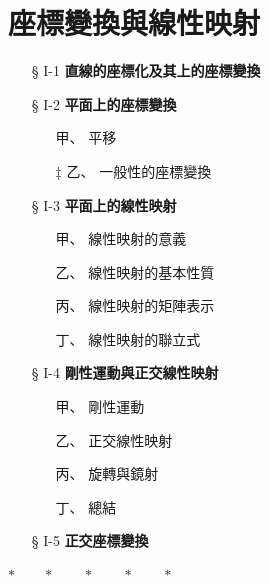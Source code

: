 
\section{座標變換與線性映射}
\label{sec:b4s-ch1}

\begin{center}
\begin{minipage}{0.75\textwidth}
\begin{itemize}[leftmargin=2em, itemsep=0.3em]
  \item[§ I-1] \textbf{直線的座標化及其上的座標變換}
  \item[§ I-2] \textbf{平面上的座標變換}
  \begin{itemize}[leftmargin=2em, itemsep=0.2em]
    \item[甲、] 平移
    \item[$\ddagger$ 乙、] 一般性的座標變換
  \end{itemize}
  \item[§ I-3] \textbf{平面上的線性映射}
  \begin{itemize}[leftmargin=2em, itemsep=0.2em]
    \item[甲、] 線性映射的意義
    \item[乙、] 線性映射的基本性質
    \item[丙、] 線性映射的矩陣表示
    \item[丁、] 線性映射的聯立式
  \end{itemize}
  \item[§ I-4] \textbf{剛性運動與正交線性映射}
  \begin{itemize}[leftmargin=2em, itemsep=0.2em]
    \item[甲、] 剛性運動
    \item[乙、] 正交線性映射
    \item[丙、] 旋轉與鏡射
    \item[丁、] 總結
  \end{itemize}
  \item[§ I-5] \textbf{正交座標變換}
\end{itemize}
\end{minipage}
\end{center}

\begin{center}
$* \qquad * \qquad * \qquad * \qquad *$
\end{center}

